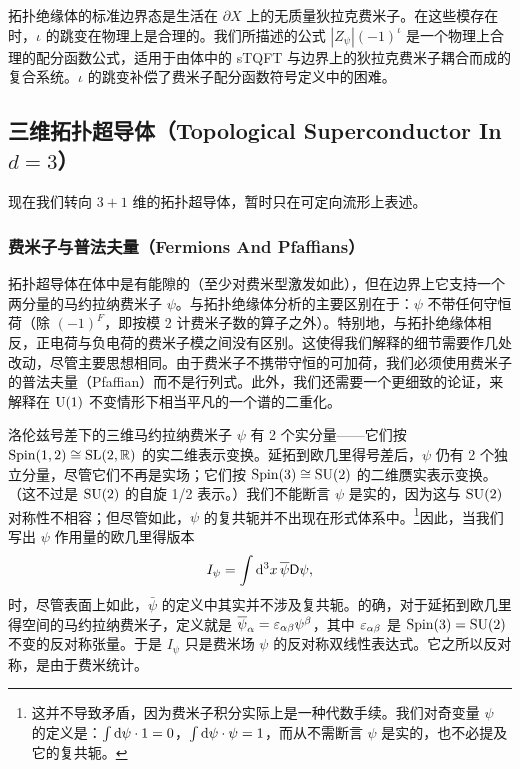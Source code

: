 拓扑绝缘体的标准边界态是生活在 $\partial X$ 上的无质量狄拉克费米子。在这些模存在时，$\iota$ 的跳变在物理上是合理的。我们所描述的公式 $|Z_\psi|(-1)^\iota$ 是一个物理上合理的配分函数公式，适用于由体中的 sTQFT 与边界上的狄拉克费米子耦合而成的复合系统。$\iota$ 的跳变补偿了费米子配分函数符号定义中的困难。

\subsection{三维拓扑超导体（Topological Superconductor In $d=3$）}\label{topsup}

现在我们转向 $3+1$ 维的拓扑超导体，暂时只在可定向流形上表述。

\subsubsection{费米子与普法夫量（Fermions And Pfaffians）}\label{ferp}

拓扑超导体在体中是有能隙的（至少对费米型激发如此），但在边界上它支持一个两分量的马约拉纳费米子 $\psi$。与拓扑绝缘体分析的主要区别在于：$\psi$ 不带任何守恒荷（除 $(-1)^F$，即按模 2 计费米子数的算子之外）。特别地，与拓扑绝缘体相反，正电荷与负电荷的费米子模之间没有区别。这使得我们解释的细节需要作几处改动，尽管主要思想相同。由于费米子不携带守恒的可加荷，我们必须使用费米子的普法夫量（Pfaffian）而不是行列式。此外，我们还需要一个更细致的论证，来解释在 ${\mathrm U}(1)$ 不变情形下相当平凡的一个谱的二重化。


洛伦兹号差下的三维马约拉纳费米子 $\psi$ 有 2 个实分量------它们按 ${\mathrm{Spin}}(1,2)\cong {\mathrm{SL}}(2,{\mathbb{R}})$ 的实二维表示变换。延拓到欧几里得号差后，$\psi$ 仍有 2 个独立分量，尽管它们不再是实场；它们按 ${\mathrm{Spin}}(3)\cong {\mathrm{SU}}(2)$ 的二维赝实表示变换。（这不过是 ${\mathrm{SU}}(2)$ 的自旋 1/2 表示。）我们不能断言 $\psi$ 是实的，因为这与 ${\mathrm{SU}}(2)$ 对称性不相容；但尽管如此，$\psi$ 的复共轭并不出现在形式体系中。\footnote{这并不导致矛盾，因为费米子积分实际上是一种代数手续。我们对奇变量 $\psi$ 的定义是：$\int{\mathrm d} \psi\cdot 1=0$，$\int {\mathrm d}\psi\cdot\psi=1$，而从不需断言 $\psi$ 是实的，也不必提及它的复共轭。}因此，当我们写出 $\psi$ 作用量的欧几里得版本
\begin{equation}\label{zorb}I_\psi=\int{\mathrm d}^3x\,\overline\psi {\sf D} \psi,  \end{equation}
时，尽管表面上如此，$\bar\psi$ 的定义中其实并不涉及复共轭。的确，对于延拓到欧几里得空间的马约拉纳费米子，定义就是 $\overline\psi_\alpha=\varepsilon_{\alpha\beta}\psi^\beta$，其中 $\varepsilon_{\alpha\beta}$ 是 ${\mathrm{Spin}}(3)={\mathrm{SU}}(2)$ 不变的反对称张量。于是 $I_\psi$ 只是费米场 $\psi$ 的反对称双线性表达式。它之所以反对称，是由于费米统计。

